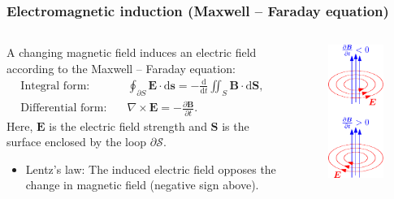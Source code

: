 \begin{frame}
	\frametitle{Electromagnetic induction (Maxwell -- Faraday equation)}
    \begin{columns}
		\begin{column}{0.6\textwidth}
            A changing magnetic field induces an electric field according to the Maxwell -- Faraday equation:
            \begin{align}
                \mbox{Integral form:} \quad & \oint_{\partial S} \bm{E} \cdot \mathrm{d}\bm{s} = -\frac{\mathrm{d}}{\mathrm{d}t}\iint_{S}\bm{B}\cdot\mathrm{d}\bm{S},\\
                \mbox{Differential form:} \quad &\nabla \times \bm{E} = -\frac{\partial \bm{B}}{\partial t}.
                \label{eq:induction_law}
            \end{align}
            Here, $\bm{E}$ is the electric field strength and $\bm{S}$ is the surface enclosed by the loop $\partial\mathcal{S}$.
            \begin{itemize}
                \item<2-> Lentz's law: The induced electric field opposes the change in magnetic field (negative sign above).
            \end{itemize}
		\end{column}
        \hfill
		\begin{column}{0.38\textwidth}
			\begin{figure}
				\centering
				\includegraphics[height=0.6\textheight]{fig/lec02/Electromagnetic_induction.pdf}

\end{figure}
\end{column}
\end{columns}
\end{frame}
